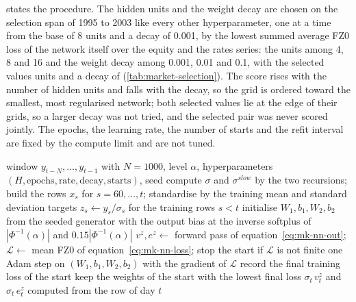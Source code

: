  states the procedure. The hidden units and the weight decay are chosen on the selection span of 1995 to 2003 like every other hyperparameter, one at a time from the base of 8 units and a decay of 0.001, by the lowest summed average FZ0 loss of the network itself
over the equity and the rates series: the units among 4, 8 and 16 and the weight decay among 0.001, 0.01 and 0.1, with the selected values \mkSelNnHiddenUnits{} units and a decay of \mkSelNnWeightDecay{}
(\cref{tab:market-selection}). The score rises with the number of hidden units and falls with the decay, so the grid is ordered toward the smallest, most regularised network; both
selected values lie at the edge of their grids, so a larger decay was not tried, and the selected pair was never scored jointly. The epochs, the learning rate, the number of starts and the refit interval are fixed by the compute limit and are not tuned.

\begin{algorithm}[htbp]
\caption{Fit and forecast of the quantile network for one forecast day and one tail level.}
\label{alg:mk-net}
\begin{algorithmic}[1]
\Require window $y_{t-N},\dots,y_{t-1}$ with $N=1000$, level $\alpha$, hyperparameters $(H,\text{epochs},\text{rate},\text{decay},\text{starts})$, seed
\State compute $\sigma$ and $\sigma^{slow}$ by the two recursions; build the rows $x_s$ for $s=60,\dots,t$; standardise by the training mean and standard deviation
\State targets $z_s\gets y_s/\sigma_s$ for the training rows $s<t$
\State initialise $W_1,b_1,W_2,b_2$ from the seeded generator with the output bias at the inverse softplus of $|\Phi^{-1}(\alpha)|$ and $0.15|\Phi^{-1}(\alpha)|$
\State $v^z,e^z\gets$ forward pass of equation~\eqref{eq:mk-nn-out}; $\mathcal L\gets$ mean FZ0 of equation~\eqref{eq:mk-nn-loss}; stop the start if $\mathcal L$ is not finite
\State one Adam step on $(W_1,b_1,W_2,b_2)$ with the gradient of $\mathcal L$
\EndFor
\State record the final training loss of the start
\EndFor
\State keep the weights of the start with the lowest final loss
\State \Return $\sigma_t\,v^z_t$ and $\sigma_t\,e^z_t$ computed from the row of day $t$
\end{algorithmic}
\end{algorithm}

